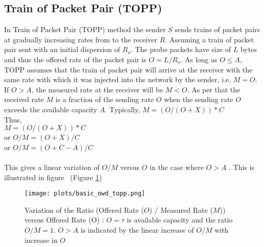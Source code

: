 \subsection{Train of Packet Pair (TOPP)}
In Train of Packet Pair (TOPP) method the sender $S$ sends trains of
packet pairs at gradually increasing rates from to the receiver
$R$. Assuming a train of packet pair sent with an initial dispersion
of $R_o$. The probe packets have size of $L$ bytes and thus the
offered rate of the packet pair is $O = L / R_o$. As long as $O \leq
A$, TOPP assumes that the train of packet pair will arrive at the
receiver with the same rate with which it was injected into the
network by the sender, i.e. $M = O$.  If $O>A$, the measured rate at
the receiver will be $M<O$. As per \cite{TOPP_globecom2000} that the
received rate $M$ is a fraction of the sending rate $O$ when the
sending rate $O$ exceeds the available capacity $A$. Typically, {\bf$M
= (O/(O+X))*C$ } \\


\noindent Thus,\\
\noindent $M = (O/(O+X))*C$\\
\noindent or $O/M = (O + X) / C $\\
\noindent or $O/M = (O + C - A) / C $\\
\\


\noindent This gives a linear variation of $O/M$ versus $O$ in the case where $O>A$ . This is illustrated in figure ~(Figure \ref{TOPP_knee_points}) 

\begin{figure}[htp]
  \texttt{[image: plots/basic\_owd\_topp.png]}	
  \caption{Variation of the Ratio (Offered Rate ($O$) / Measured Rate
  ($M$)) versus Offered Rate (O) : $O = \tau$ is available capacity
  and the ratio $O/M = 1$. $O>A$ is indicated by the linear increase
  of $O/M$ with increase in $O$ }
  \label{TOPP_knee_points}	
 \vspace{-.1in}
\end{figure}


